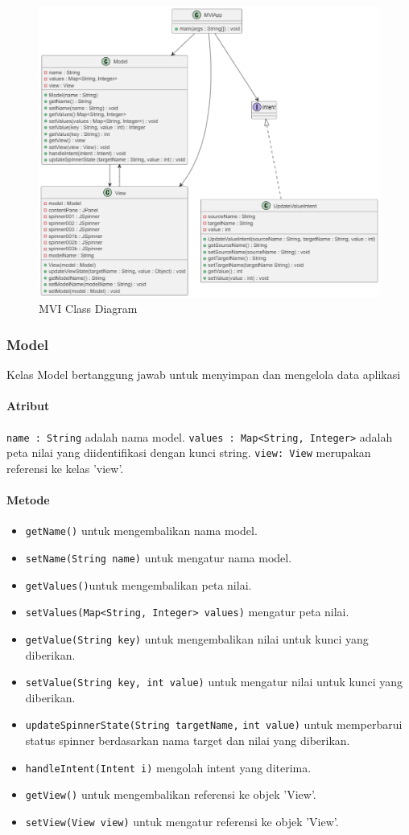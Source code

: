 \documentclass[conference]{IEEEtran}
\begin{document}
\begin{figure}[h!]
    \centering
    \includegraphics[width=0.7\linewidth]{MVIClassDiagram.png}
    \caption{MVI Class Diagram}
    \label{fig:enter-label}
\end{figure}

\setcounter{subsubsection}{0}

\subsubsection{Model}
Kelas Model bertanggung jawab untuk menyimpan dan mengelola data aplikasi
\paragraph{Atribut}
\verb |name : String| adalah nama model.
\verb |values : Map<String, Integer>| adalah peta nilai yang diidentifikasi dengan kunci string.
\verb |view: View| merupakan referensi ke kelas 'view'.
\paragraph{Metode}
\begin{itemize}
\item \verb |getName()| untuk mengembalikan nama model.
\item \verb |setName(String name)| untuk mengatur nama model.
\item \verb |getValues()|untuk mengembalikan peta nilai.
\item \verb |setValues(Map<String, Integer> values)| mengatur peta nilai.
\item \verb |getValue(String key)| untuk mengembalikan nilai untuk kunci yang diberikan.
\item \verb |setValue(String key, int value)| untuk mengatur nilai untuk kunci yang diberikan.
\item \verb |updateSpinnerState(String targetName,| \verb |int value)| untuk memperbarui status spinner berdasarkan nama target dan nilai yang diberikan.
\item \verb |handleIntent(Intent i)| mengolah intent yang diterima.
\item \verb |getView()| untuk mengembalikan referensi ke objek 'View'.
\item \verb |setView(View view)| untuk mengatur referensi ke objek 'View'.\\
\end{itemize} 
\end{document}

